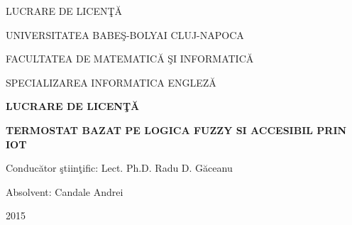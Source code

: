 \documentclass[a4paper, 12pt, english]{report}
\begin{document}
\begin{titlepage}
\sloppy
\vspace*{\fill}
\begin{center}
\Huge{LUCRARE DE LICEN\c{T}\u{A}}
\vspace*{\fill}

\end{center}
\end{titlepage}
\flushpage

\begin{titlepage}
\sloppy
\begin{center}
\Large{UNIVERSITATEA BABE\c{S}-BOLYAI CLUJ-NAPOCA}

\Large{FACULTATEA DE MATEMATIC\u{A} \c{S}I INFORMATIC\u{A} }

\Large{SPECIALIZAREA INFORMATICA ENGLEZ\u{A}}



\vspace{7cm}

\Large \textbf{LUCRARE DE LICEN\c{T}\u{A} }

\vspace{1.3cm}

\Huge \textbf{TERMOSTAT BAZAT PE LOGICA FUZZY SI ACCESIBIL PRIN IOT}

\end{center}
\vspace{4cm}

\begin{flushleft}
    \Large{Conduc\u{a}tor \c{s}tiin\c{t}ific: Lect. Ph.D. Radu D. G\u{a}ceanu}
\end{flushleft}

\vspace{1cm}

\begin{flushright}
\Large{Absolvent: Candale Andrei}

\end{flushright}

\vspace{1cm}

\begin{center}
\Large{2015}
\end{center}

\end{titlepage}
\end{document}
